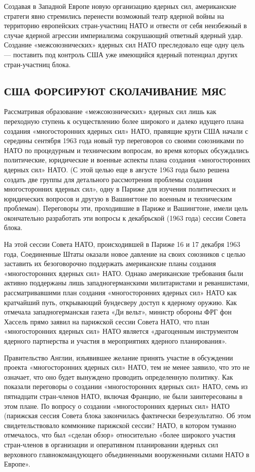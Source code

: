 \documentclass[12pt, a4paper, openany]{book}
\begin{document}
	Создавая в Западной Европе новую организацию ядерных сил, американские стратеги явно стремились перенести возможный театр ядерной войны на территорию европейских стран-участниц НАТО и отвести от себя неизбежный в случае ядерной агрессии империализма сокрушающий ответный ядерный удар. Создание «межсоюзнических» ядерных сил НАТО преследовало еще одну цель — поставить под контроль США уже имеющийся ядерный потенциал других стран-участниц блока.
	

	\subsection[США форсируют сколачивание МЯС]{\center США ФОРСИРУЮТ СКОЛАЧИВАНИЕ МЯС}	
	
	Рассматривая образование «межсоюзнических» ядерных сил лишь как переходную ступень к осуществлению более широкого и далеко идущего плана создания «многосторонних ядерных сил» НАТО, правящие круги США начали с середины сентября 1963 года новый тур переговоров со своими союзниками по НАТО по процедурным и техническим вопросам, во время которых обсуждались политические, юридические и военные аспекты плана создания «многосторонних ядерных сил» НАТО. (С этой целью еще в августе 1963 года было решена создать две группы для детального рассмотрения проблемы создания многосторонних ядерных сил», одну в Париже для изучения политических и юридических вопросов и другую в Вашингтоне по военным и техническим проблемам). Переговоры эти, проходившие в Париже и Вашингтоне, имели цель окончательно разработать эти вопросы к декабрьской (1963 года) сессии Совета блока.
	
	На этой сессии Совета НАТО, происходившей в Париже 16 и 17 декабря 1963 года, Соединенные Штаты оказали новое давление на своих союзников с целью заставить их безоговорочно поддержать американские планы создания «многосторонних ядерных сил» НАТО. Однако американские требования были активно поддержаны лишь западногерманскими милитаристами и реваншистами, рассматривавшими план создания «многосторонних ядерных сил» НАТО как кратчайший путь, открывающий бундесверу доступ к ядерному оружию. Как отмечала западногерманская газета «Ди вельт», министр обороны ФРГ фон Хассель прямо заявил на парижской сессии Совета НАТО, что план «многосторонних ядерных сил» НАТО является «драгоценным инструментом ядерного партнерства и участия в мероприятиях ядерного планирования».
	
	Правительство Англии, изъявившее желание принять участие в обсуждении проекта «многосторонних ядерных сил» НАТО, тем не менее заявило, что это не означает, что оно будет вынуждено проводить определенную политику. Как показали переговоры о создании «многосторонних ядерных сил» НАТО, семь из пятнадцати стран-членов НАТО, включая Францию, не были заинтересованы в этом плане. По вопросу о создании «многосторонних ядерных сил» НАТО (парижская сессия Совета блока закончилась фактически безрезультатно. Об этом свидетельствовало коммюнике парижской сессии? НАТО, в котором туманно отмечалось, что был «сделан обзор» относительно «более широкого участия стран-членов в организации и оперативном планировании ядерных сил верховного главнокомандующего объединенными вооруженными силами НАТО в Европе».
	
\end{document}
